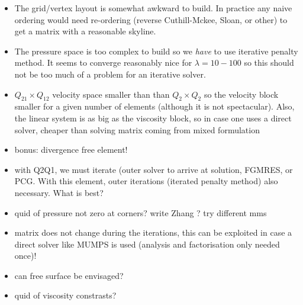 \begin{itemize}

\item The grid/vertex layout is somewhat awkward to build. In practice any naive ordering 
would need re-ordering (reverse Cuthill-Mckee, Sloan, or other) to get a matrix with a reasonable skyline.

\item The pressure space is too complex to build so we {\it have} to use iterative penalty method. 
It seems to converge reasonably nice for $\lambda=10-100$ so this should not 
be too much of a problem for an iterative solver.

\item $Q_{21}\times Q_{12}$ velocity space smaller than than $Q_2\times Q_2$ so the velocity
block smaller for a given number of elements (although it is not spectacular). 
Also, the linear system is as big as the viscosity block, so in case one uses 
a direct solver, cheaper than solving matrix coming from mixed formulation

\item bonus: divergence free element!

\item with Q2Q1, we must iterate (outer solver to arrive at solution, FGMRES, or PCG. 
With this element, outer iterations (iterated penalty method) also necessary. What is best?

\item quid of pressure not zero at corners? write Zhang ? try different mms 

\item matrix does not change during the iterations, this can be exploited in case a direct solver
like MUMPS is used (analysis and factorisation only needed once)!

\item can free surface be envisaged?

\item quid of viscosity constrasts? 

\end{itemize}

